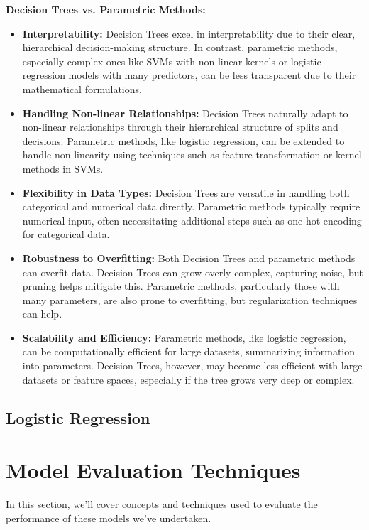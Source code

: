 \documentclass[letterpaper,10pt]{article}
\begin{document}
\textbf{Decision Trees vs. Parametric Methods:}
\begin{itemize}
\item \textbf{Interpretability:} Decision Trees excel in interpretability due to their clear, hierarchical decision-making structure. In contrast, parametric methods, especially complex ones like SVMs with non-linear kernels or logistic regression models with many predictors, can be less transparent due to their mathematical formulations.
\item \textbf{Handling Non-linear Relationships:} Decision Trees naturally adapt to non-linear relationships through their hierarchical structure of splits and decisions. Parametric methods, like logistic regression, can be extended to handle non-linearity using techniques such as feature transformation or kernel methods in SVMs.

\item \textbf{Flexibility in Data Types:} Decision Trees are versatile in handling both categorical and numerical data directly. Parametric methods typically require numerical input, often necessitating additional steps such as one-hot encoding for categorical data.

\item \textbf{Robustness to Overfitting:} Both Decision Trees and parametric methods can overfit data. Decision Trees can grow overly complex, capturing noise, but pruning helps mitigate this. Parametric methods, particularly those with many parameters, are also prone to overfitting, but regularization techniques can help.

\item \textbf{Scalability and Efficiency:} Parametric methods, like logistic regression, can be computationally efficient for large datasets, summarizing information into parameters. Decision Trees, however, may become less efficient with large datasets or feature spaces, especially if the tree grows very deep or complex.
\end{itemize}




\newpage

\subsection{Logistic Regression}

\newpage


\section{Model Evaluation Techniques}
In this section, we'll cover concepts and techniques used to evaluate the performance of these models we've undertaken.
\end{document}
